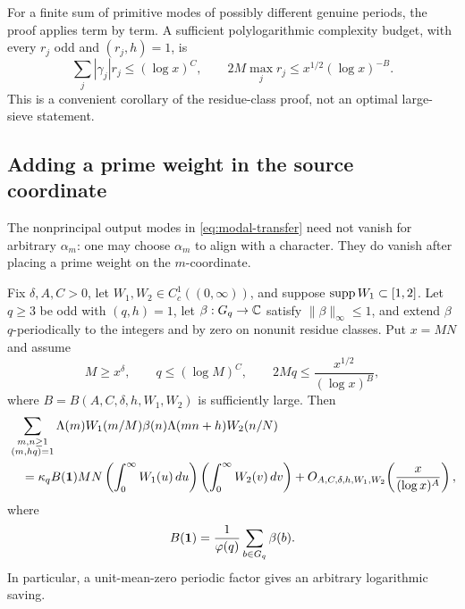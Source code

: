 For a finite sum of primitive modes of possibly different genuine periods,
the proof applies term by term.  A sufficient polylogarithmic complexity
budget, with every $r_j$ odd and $(r_j,h)=1$, is
\begin{equation}\label{eq:mode-complexity-budget}
 \sum_j|\gamma_j|r_j\leq(\log x)^C,
 \qquad
 2M\max_j r_j\leq x^{1/2}(\log x)^{-B}.
\end{equation}
This is a convenient corollary of the residue-class proof, not an optimal
large-sieve statement.

\subsection{Adding a prime weight in the source coordinate}

The nonprincipal output modes in \eqref{eq:modal-transfer} need not vanish
for arbitrary $\alpha_m$: one may choose $\alpha_m$ to align with a character.
They do vanish after placing a prime weight on the $m$-coordinate.

\begin{corollary}
\label{cor:prime-source-periodic-factor}
Fix $\delta,A,C>0$, let $W_1,W_2\in C_c^1((0,\infty))$, and suppose
$\operatorname{supp} W_1\subset[1,2]$.  Let $q\geq3$ be odd with $(q,h)=1$, let
$\beta:G_q\to\mathbb C$ satisfy $\|\beta\|_\infty\leq1$, and extend $\beta$
$q$-periodically to the integers and by zero on nonunit residue classes.
Put $x=MN$ and assume
\begin{equation}\label{eq:prime-source-range}
 M\geq x^\delta,
 \qquad
 q\leq(\log M)^C,
 \qquad
 2Mq\leq\frac{x^{1/2}}{(\log x)^B},
\end{equation}
where $B=B(A,C,\delta,h,W_1,W_2)$ is sufficiently large.  Then
\begin{align}
 &\sum_{\substack{m,n\geq1\\(m,hq)=1}}
 \Lambda(m)W_1(m/M)\beta(n)
 \Lambda(mn+h)W_2(n/N)
 \notag\\
 &\quad=
 \kappa_q B(\mathbf 1)MN
 \left(\int_0^\infty W_1(u)\,du\right)
 \left(\int_0^\infty W_2(v)\,dv\right)
 +O_{A,C,\delta,h,W_1,W_2}\!\left(\frac{x}{(\log x)^A}\right),
 \label{eq:prime-source-asymptotic}
\end{align}
where
\begin{equation}\label{eq:beta-unit-mean}
 B(\mathbf 1)=\frac1{\varphi(q)}\sum_{b\in G_q}\beta(b).
\end{equation}
In particular, a unit-mean-zero periodic factor gives an arbitrary
logarithmic saving.
\end{corollary}

